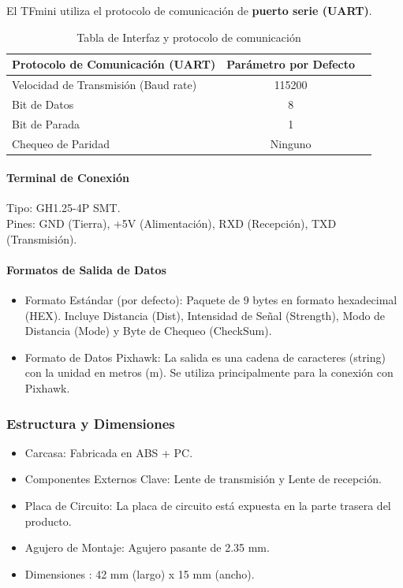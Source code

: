 \documentclass[12pt,a4paper]{article}
\begin{document}
El TFmini utiliza el protocolo de comunicación de \textbf{puerto serie (UART)}.

\begin{table}[H]
\centering
\begin{tabular}{|l|c|r}
\hline
\textbf{Protocolo de Comunicación (UART)} & \textbf{Parámetro por Defecto} \\
\hline
Velocidad de Transmisión (Baud rate) & 115200 \\
\hline
Bit de Datos & 8 \\
\hline
Bit de Parada & 1 \\
\hline
Chequeo de Paridad & Ninguno \\
\hline
\end{tabular}
\caption{Tabla de Interfaz y protocolo de comunicación}
\end{table}

\paragraph*{Terminal de Conexión}
Tipo: GH1.25-4P SMT.\\
Pines: GND (Tierra), +5V (Alimentación), RXD (Recepción), TXD (Transmisión).

\paragraph*{Formatos de Salida de Datos}
\begin{itemize}
    \item Formato Estándar (por defecto): Paquete de 9 bytes en formato hexadecimal (HEX). Incluye Distancia (Dist), Intensidad de Señal (Strength), Modo de Distancia (Mode) y Byte de Chequeo (CheckSum).
    \item Formato de Datos Pixhawk: La salida es una cadena de caracteres (string) con la unidad en metros (m). Se utiliza principalmente para la conexión con Pixhawk.
\end{itemize}

\subsubsection{Estructura y Dimensiones}

\begin{itemize}
    \item Carcasa: Fabricada en ABS + PC.
    \item Componentes Externos Clave: Lente de transmisión y Lente de recepción.
    \item Placa de Circuito: La placa de circuito está expuesta en la parte trasera del producto.
    \item Agujero de Montaje: Agujero pasante de 2.35 mm.
    \item Dimensiones : 42 mm (largo) x 15 mm (ancho).
\end{itemize}
\end{document}
